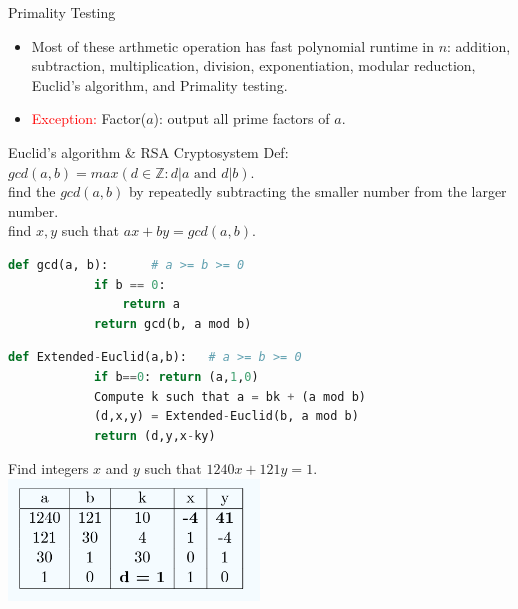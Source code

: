 \documentclass[10pt,a4paper]{article}
\begin{document}
\begin{multicols}{3}
\begin{textbox}{Primality Testing}
        \begin{itemize}
            \item Most of these arthmetic operation has fast
                  polynomial runtime in $n$: addition, subtraction, multiplication, division, exponentiation, modular reduction, Euclid's algorithm, and Primality testing.
            \item \textcolor{red}{Exception:} Factor($a$): output all prime factors of $a$.
        \end{itemize}


    \end{textbox}

    \begin{textbox}{Euclid's algorithm \& RSA Cryptosystem}
        Def: $gcd(a, b) = max(d \in \mathbb{Z} : d | a \text{ and } d | b)$.\\
         find the $gcd(a, b)$ by repeatedly subtracting the smaller number from the larger number.\\
        \linebreak
         find $x, y$ such that $ax + by = gcd(a, b)$.\\
        \begin{lstlisting}[language=Python]
        def gcd(a, b):      # a >= b >= 0
            if b == 0:
                return a
            return gcd(b, a mod b)
    \end{lstlisting}

        \begin{lstlisting}[language=Python]
        def Extended-Euclid(a,b): 	# a >= b >= 0
	        if b==0: return (a,1,0)
            Compute k such that a = bk + (a mod b)
            (d,x,y) = Extended-Euclid(b, a mod b)
            return (d,y,x-ky)

    \end{lstlisting}
         Find integers $x$ and $y$ such that $1240 x + 121 y = 1$.\\

        \includegraphics[width=0.5\textwidth]{images/ExtendedEuclid.png}


\end{textbox}
\end{multicols}
\end{document}
